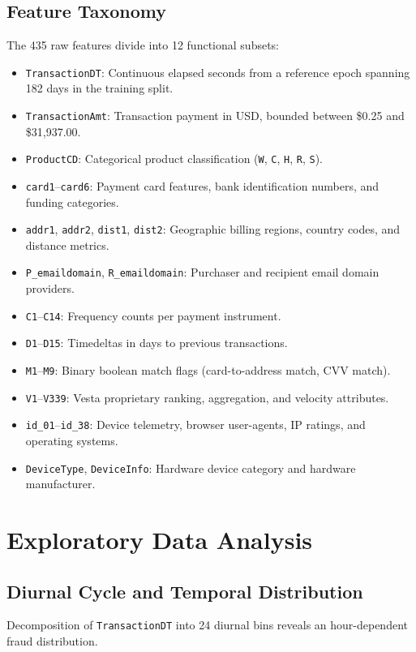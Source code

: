 \documentclass[10pt,twocolumn,a4paper]{article}
\begin{document}
\subsection{Feature Taxonomy}
The 435 raw features divide into 12 functional subsets:
\begin{itemize}
    \item \texttt{TransactionDT}: Continuous elapsed seconds from a reference epoch spanning 182 days in the training split.
    \item \texttt{TransactionAmt}: Transaction payment in USD, bounded between \$0.25 and \$31,937.00.
    \item \texttt{ProductCD}: Categorical product classification (\texttt{W}, \texttt{C}, \texttt{H}, \texttt{R}, \texttt{S}).
    \item \texttt{card1}--\texttt{card6}: Payment card features, bank identification numbers, and funding categories.
    \item \texttt{addr1}, \texttt{addr2}, \texttt{dist1}, \texttt{dist2}: Geographic billing regions, country codes, and distance metrics.
    \item \texttt{P\_emaildomain}, \texttt{R\_emaildomain}: Purchaser and recipient email domain providers.
    \item \texttt{C1}--\texttt{C14}: Frequency counts per payment instrument.
    \item \texttt{D1}--\texttt{D15}: Timedeltas in days to previous transactions.
    \item \texttt{M1}--\texttt{M9}: Binary boolean match flags (card-to-address match, CVV match).
    \item \texttt{V1}--\texttt{V339}: Vesta proprietary ranking, aggregation, and velocity attributes.
    \item \texttt{id\_01}--\texttt{id\_38}: Device telemetry, browser user-agents, IP ratings, and operating systems.
    \item \texttt{DeviceType}, \texttt{DeviceInfo}: Hardware device category and hardware manufacturer.
\end{itemize}

\section{Exploratory Data Analysis}

\subsection{Diurnal Cycle and Temporal Distribution}
Decomposition of \texttt{TransactionDT} into 24 diurnal bins reveals an hour-dependent fraud distribution.
\end{document}
